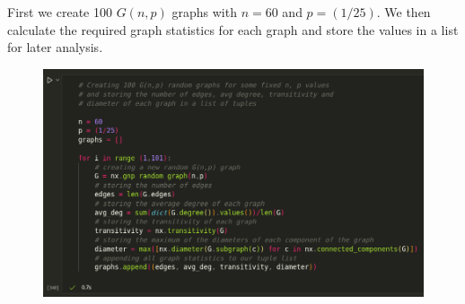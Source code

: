 \documentclass{article}
\begin{document}
    \begin{center}
        \begin{minipage}[t]{0.9\textwidth}
            First we create 100 $G(n,p)$ graphs with $n=60$ and $p=(1/25)$. We then calculate the required graph statistics
            for each graph and store the values in a list for later analysis.
            \begin{figure}[H]
                \centering
                \includegraphics[width=1\textwidth, height=0.3\textheight]{./3.png}
            \end{figure}
        \end{minipage}
    \end{center}
\end{document}
